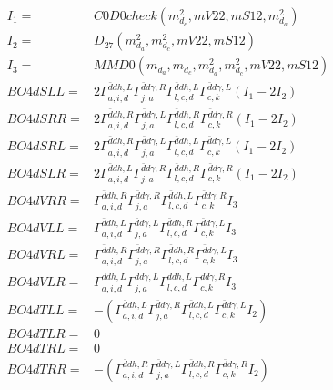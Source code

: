 \documentclass[A4,landscape]{article}
\begin{document}
\begin{align} 
I_1 = & C0D0check(m^2_{d_{{c}}}, mV22, mS12, m^2_{d_{{a}}}) \\ 
I_2 = & D_{27}(m^2_{d_{{a}}}, m^2_{d_{{c}}}, mV22, mS12) \\ 
I_3 = & MMD0(m_{d_{{a}}}, m_{d_{{c}}}, m^2_{d_{{a}}}, m^2_{d_{{c}}}, mV22, mS12) \\ 
  BO4dSLL= & 2  \Gamma^{\bar{d}d h ,L}_{a, i, d} \Gamma^{\bar{d}d \gamma ,R}_{j, a} \Gamma^{\bar{d}d h ,L}_{l, c, d} \Gamma^{\bar{d}d \gamma ,L}_{c, k} (I_1 - 2 I_2) \\ 
  BO4dSRR= & 2  \Gamma^{\bar{d}d h ,R}_{a, i, d} \Gamma^{\bar{d}d \gamma ,L}_{j, a} \Gamma^{\bar{d}d h ,R}_{l, c, d} \Gamma^{\bar{d}d \gamma ,R}_{c, k} (I_1 - 2 I_2) \\ 
  BO4dSRL= & 2  \Gamma^{\bar{d}d h ,R}_{a, i, d} \Gamma^{\bar{d}d \gamma ,L}_{j, a} \Gamma^{\bar{d}d h ,L}_{l, c, d} \Gamma^{\bar{d}d \gamma ,L}_{c, k} (I_1 - 2 I_2) \\ 
  BO4dSLR= & 2  \Gamma^{\bar{d}d h ,L}_{a, i, d} \Gamma^{\bar{d}d \gamma ,R}_{j, a} \Gamma^{\bar{d}d h ,R}_{l, c, d} \Gamma^{\bar{d}d \gamma ,R}_{c, k} (I_1 - 2 I_2) \\ 
  BO4dVRR= &  \Gamma^{\bar{d}d h ,R}_{a, i, d} \Gamma^{\bar{d}d \gamma ,R}_{j, a} \Gamma^{\bar{d}d h ,L}_{l, c, d} \Gamma^{\bar{d}d \gamma ,R}_{c, k} I_3 \\ 
  BO4dVLL= &  \Gamma^{\bar{d}d h ,L}_{a, i, d} \Gamma^{\bar{d}d \gamma ,L}_{j, a} \Gamma^{\bar{d}d h ,R}_{l, c, d} \Gamma^{\bar{d}d \gamma ,L}_{c, k} I_3 \\ 
  BO4dVRL= &  \Gamma^{\bar{d}d h ,R}_{a, i, d} \Gamma^{\bar{d}d \gamma ,R}_{j, a} \Gamma^{\bar{d}d h ,R}_{l, c, d} \Gamma^{\bar{d}d \gamma ,L}_{c, k} I_3 \\ 
  BO4dVLR= &  \Gamma^{\bar{d}d h ,L}_{a, i, d} \Gamma^{\bar{d}d \gamma ,L}_{j, a} \Gamma^{\bar{d}d h ,L}_{l, c, d} \Gamma^{\bar{d}d \gamma ,R}_{c, k} I_3 \\ 
  BO4dTLL= & -( \Gamma^{\bar{d}d h ,L}_{a, i, d} \Gamma^{\bar{d}d \gamma ,R}_{j, a} \Gamma^{\bar{d}d h ,L}_{l, c, d} \Gamma^{\bar{d}d \gamma ,L}_{c, k} I_2) \\ 
  BO4dTLR= & 0 \\ 
  BO4dTRL= & 0 \\ 
  BO4dTRR= & -( \Gamma^{\bar{d}d h ,R}_{a, i, d} \Gamma^{\bar{d}d \gamma ,L}_{j, a} \Gamma^{\bar{d}d h ,R}_{l, c, d} \Gamma^{\bar{d}d \gamma ,R}_{c, k} I_2) \\ 
\end{align} 
\end{document}
